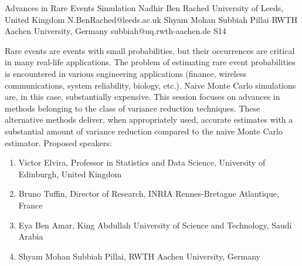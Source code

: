 

\clearpage

\begin{session}
 {Advances in Rare Events Simulation}%
 {Nadhir Ben Rached}%
 {University of Leeds, United Kingdom}%
 {N.BenRached@leeds.ac.uk}%
 {Shyam Mohan Subbiah Pillai}%
 {RWTH Aachen University, Germany}%
 {subbiah@uq.rwth-aachen.de}%
 {S14}%
 {}%

 Rare events are events with small probabilities, but their occurrences are critical in many real-life applications. The problem of estimating rare event probabilities is encountered in various engineering applications (finance, wireless communications, system reliability, biology, etc.). Naive Monte Carlo simulations are, in this case, substantially expensive. This session focuses on advances in methods belonging to the class of variance reduction techniques.  These alternative methods deliver, when appropriately used, accurate estimates with a substantial amount of variance reduction compared to the naive Monte Carlo estimator.
 Proposed speakers:
 \begin{enumerate}
 \item Victor Elvira, Professor in Statistics and Data Science, University of Edinburgh, United Kingdom
 \item Bruno Tuffin, Director of Research, INRIA Rennes-Bretagne Atlantique, France
 \item Eya Ben Amar, King Abdullah University of Science and Technology, Saudi Arabia
 \item Shyam Mohan Subbiah Pillai, RWTH Aachen University, Germany
 \end{enumerate}
 \medskip
\end{session}



\clearpage

